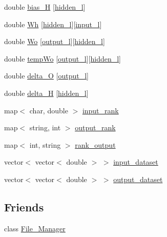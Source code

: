 \begin{DoxyCompactItemize}
\item 
double \hyperlink{a00003_a38808438a02d406a7ab54c8bf825752a}{bias\-\_\-\-H} \mbox{[}\hyperlink{a00008_aa7fdf42e8c0a65ea15cb37a990708e36}{hidden\-\_\-l}\mbox{]}
\item 
double \hyperlink{a00003_a45dfc138d645e05eaeaa6ca6bb3df818}{Wh} \mbox{[}\hyperlink{a00008_aa7fdf42e8c0a65ea15cb37a990708e36}{hidden\-\_\-l}\mbox{]}\mbox{[}\hyperlink{a00008_a8dae3b2c955083e02ba56da92adbf25d}{input\-\_\-l}\mbox{]}
\item 
double \hyperlink{a00003_ad6730ce7c9fc3937299dd32473b12d1d}{Wo} \mbox{[}\hyperlink{a00008_a0a0ddfc9fb3bc3d90d175ed1f7bd54c5}{output\-\_\-l}\mbox{]}\mbox{[}\hyperlink{a00008_aa7fdf42e8c0a65ea15cb37a990708e36}{hidden\-\_\-l}\mbox{]}
\item 
double \hyperlink{a00003_a1cca3513af05c6dce603fdf332b36691}{temp\-Wo} \mbox{[}\hyperlink{a00008_a0a0ddfc9fb3bc3d90d175ed1f7bd54c5}{output\-\_\-l}\mbox{]}\mbox{[}\hyperlink{a00008_aa7fdf42e8c0a65ea15cb37a990708e36}{hidden\-\_\-l}\mbox{]}
\item 
double \hyperlink{a00003_ae5f829ba5e65ae91d5c4feda5f66e37a}{delta\-\_\-\-O} \mbox{[}\hyperlink{a00008_a0a0ddfc9fb3bc3d90d175ed1f7bd54c5}{output\-\_\-l}\mbox{]}
\item 
double \hyperlink{a00003_a51e5c2d2b53ba284c5b3791446c3b7d8}{delta\-\_\-\-H} \mbox{[}\hyperlink{a00008_aa7fdf42e8c0a65ea15cb37a990708e36}{hidden\-\_\-l}\mbox{]}
\item 
map$<$ char, double $>$ \hyperlink{a00003_adf2c6662b130ed1582025ea2cccacbe2}{input\-\_\-rank}
\item 
map$<$ string, int $>$ \hyperlink{a00003_af46a9de8ef619f93fb8c0231be79163c}{output\-\_\-rank}
\item 
map$<$ int, string $>$ \hyperlink{a00003_a8e34531b701290d16068e3685f3066a4}{rank\-\_\-output}
\item 
vector$<$ vector$<$ double $>$ $>$ \hyperlink{a00003_a81bab51b36643c5b10ba25d518c27ff3}{input\-\_\-dataset}
\item 
vector$<$ vector$<$ double $>$ $>$ \hyperlink{a00003_aa8441449f55f07c3da384d81608373b5}{output\-\_\-dataset}
\end{DoxyCompactItemize}
\subsection*{Friends}
\begin{DoxyCompactItemize}
\item 
class \hyperlink{a00003_a96aa84fcda6b19a74fff9d19c16b07fe}{File\-\_\-\-Manager}
\end{DoxyCompactItemize}


